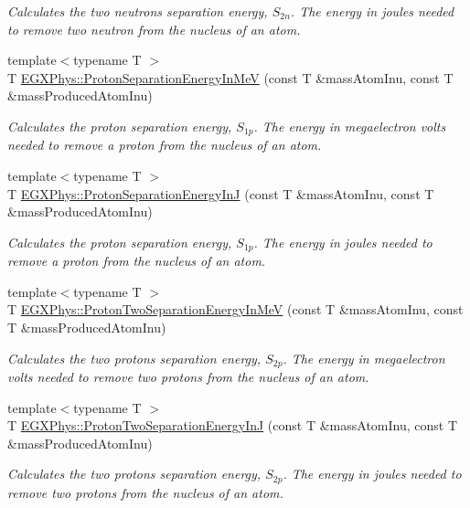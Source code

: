 \begin{DoxyCompactItemize}
\begin{DoxyCompactList}\small\item\em Calculates the two neutrons separation energy, $S_{2n}$. The energy in joules needed to remove two neutron from the nucleus of an atom. \end{DoxyCompactList}\item 
{\footnotesize template$<$typename T $>$ }\\T \hyperlink{group___nuclear_separation_energy_ga6a619ded55c47ed22ea2d8a85202ebeb}{E\+G\+X\+Phys\+::\+Proton\+Separation\+Energy\+In\+MeV} (const T \&mass\+Atom\+Inu, const T \&mass\+Produced\+Atom\+Inu)
\begin{DoxyCompactList}\small\item\em Calculates the proton separation energy, $S_{1p}$. The energy in megaelectron volts needed to remove a proton from the nucleus of an atom. \end{DoxyCompactList}\item 
{\footnotesize template$<$typename T $>$ }\\T \hyperlink{group___nuclear_separation_energy_ga4274d8f5a3860169fd81970707eb582a}{E\+G\+X\+Phys\+::\+Proton\+Separation\+Energy\+InJ} (const T \&mass\+Atom\+Inu, const T \&mass\+Produced\+Atom\+Inu)
\begin{DoxyCompactList}\small\item\em Calculates the proton separation energy, $S_{1p}$. The energy in joules needed to remove a proton from the nucleus of an atom. \end{DoxyCompactList}\item 
{\footnotesize template$<$typename T $>$ }\\T \hyperlink{group___nuclear_separation_energy_ga0de42783a7c650eb32f85dc2d40d84d7}{E\+G\+X\+Phys\+::\+Proton\+Two\+Separation\+Energy\+In\+MeV} (const T \&mass\+Atom\+Inu, const T \&mass\+Produced\+Atom\+Inu)
\begin{DoxyCompactList}\small\item\em Calculates the two protons separation energy, $S_{2p}$. The energy in megaelectron volts needed to remove two protons from the nucleus of an atom. \end{DoxyCompactList}\item 
{\footnotesize template$<$typename T $>$ }\\T \hyperlink{group___nuclear_separation_energy_gad7c1d4a32daa8aaa53c5fce37c421f82}{E\+G\+X\+Phys\+::\+Proton\+Two\+Separation\+Energy\+InJ} (const T \&mass\+Atom\+Inu, const T \&mass\+Produced\+Atom\+Inu)
\begin{DoxyCompactList}\small\item\em Calculates the two protons separation energy, $S_{2p}$. The energy in joules needed to remove two protons from the nucleus of an atom. \end{DoxyCompactList}\end{DoxyCompactItemize}


